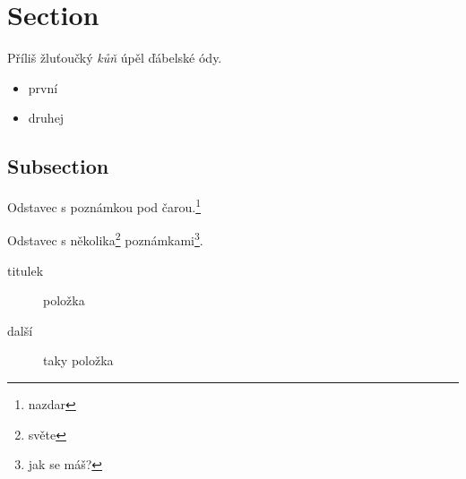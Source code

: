 \documentclass{article}
\begin{document}


\section{Section}
Příliš žluťoučký \textit{kůň} úpěl ďábelské ódy. 
\lipsum[2-12]
\begin{itemize}
\item první
\item druhej
\end{itemize}
\subsection{Subsection}
\lipsum[2]

Odstavec s poznámkou pod čarou.\footnote{nazdar}

Odstavec s několika\footnote{světe} poznámkami\footnote{jak se máš?}. 
\lipsum[4-8]
\begin{description}
\item[titulek] položka
\item[další] taky položka
\end{description}
\lipsum[3-20]
\end{document}
